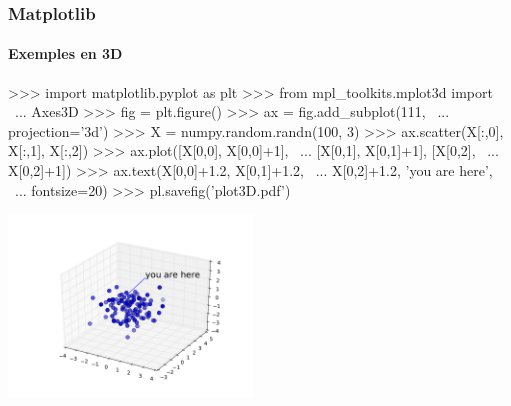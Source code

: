 \begin{frame}[fragile]
\frametitle{Matplotlib}
\framesubtitle{Exemples en 3D}
\begin{minipage}{5.2cm}
\begin{pythonConsole}
>>> import matplotlib.pyplot as plt
>>> from mpl_toolkits.mplot3d import \ 
... Axes3D
>>> fig = plt.figure()
>>> ax = fig.add_subplot(111, \ 
...	projection='3d')
>>> X = numpy.random.randn(100, 3)
>>> ax.scatter(X[:,0], X[:,1], X[:,2])
>>> ax.plot([X[0,0], X[0,0]+1], \ 
...	[X[0,1], X[0,1]+1], [X[0,2], \
... X[0,2]+1])
>>> ax.text(X[0,0]+1.2, X[0,1]+1.2, \ 
...	X[0,2]+1.2, 'you are here', \
... fontsize=20)
>>> pl.savefig('plot3D.pdf')
\end{pythonConsole}
\end{minipage}
\begin{minipage}{5.cm}
\begin{center}\includegraphics[width=6.5cm]{fig/plot3D.pdf}\end{center}
\end{minipage}
\end{frame}
